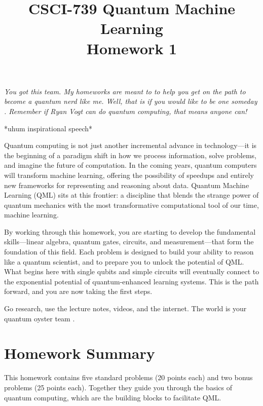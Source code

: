 \documentclass[11pt]{article}
\title{CSCI-739 Quantum Machine Learning\\[2pt]
\large Homework 1}
\date{} %
\newcounter{problem}
\newcounter{bonus}
\begin{document}
\maketitle

\begin{center}
\textit{You got this team. My homeworks are meant to to help you get on the path to become a quantum nerd like me. Well, that is if you would like to be one someday \smiley{}. Remember if Ryan Vogt can do quantum computing, that means anyone can! }
\end{center}

\vspace{1em}

\noindent
*uhum inspirational speech*

Quantum computing is not just another incremental advance in technology—it is the beginning of a paradigm shift in how we process information, solve problems, and imagine the future of computation. In the coming years, quantum computers will transform machine learning, offering the possibility of speedups and entirely new frameworks for representing and reasoning about data. Quantum Machine Learning (QML) sits at this frontier: a discipline that blends the strange power of quantum mechanics with the most transformative computational tool of our time, machine learning. 

By working through this homework, you are starting to develop the fundamental skills—linear algebra, quantum gates, circuits, and measurement—that form the foundation of this field. Each problem is designed to build your ability to reason like a quantum scientist, and to prepare you to unlock the potential of QML. What begins here with single qubits and simple circuits will eventually connect to the exponential potential of quantum-enhanced learning systems. This is the path forward, and you are now taking the first steps.

Go research, use the lecture notes, videos, and the internet. The world is your quantum oyster team \smiley{}.

\vspace{1em}

\section*{Homework Summary}
This homework contains five standard problems (20 points each) and two bonus problems (25 points each). Together they guide you through the basics of quantum computing, which are the building blocks to facilitate QML.
\end{document}
